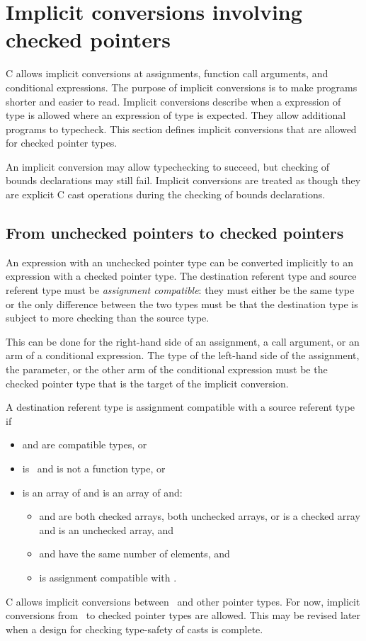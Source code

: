 \section{Implicit conversions involving checked pointers}
\label{section:implicit-conversions}

C allows implicit conversions at assignments, function call arguments,
and conditional expressions.  The purpose of
implicit conversions is to make programs shorter and easier to
read.  Implicit conversions describe when a expression of type
 is allowed where an expression of type  is expected.
They allow additional programs to typecheck.
This section defines implicit conversions that are allowed for checked 
pointer types.

An implicit conversion may allow typechecking to succeed, but
checking of bounds declarations may still fail.  Implicit
conversions are treated as though they are explicit C cast 
operations during the checking of bounds declarations.

\subsection{From unchecked pointers to checked pointers}
An expression with an unchecked pointer type can be converted implicitly to an
expression with a checked pointer type.   The destination referent type
and source referent type must be {\em assignment compatible}: they must
either be the same type or the only difference between the two types must be that
the destination type is subject to more checking than the source type.

This can be done for the right-hand side of an assignment, a call argument,
or an arm of a conditional expression.
The type of the left-hand side of the assignment, the parameter, or the other 
arm of the conditional expression must be the checked pointer type that is the
target of the implicit conversion.

A destination referent type  is assignment compatible with a source referent
type  if
\begin{itemize}
\item {} and  are compatible types, or
\item {} is \void\ and  is not a function type, or
\item {} is an array of  and  is an array of 
and:
\begin{itemize}
\item {} and  are both checked arrays, both unchecked arrays, or
 is a checked array and  is an unchecked array, and
\item {} and  have the same number of elements, and
\item {} is assignment compatible with .
\end{itemize}
\end{itemize}
C allows implicit conversions between \uncheckedptrvoid\ and other pointer
types. For now, implicit conversions from \uncheckedptrvoid\ to checked pointer
types are allowed. This may be revised later when a design
for checking type-safety of casts is complete.

